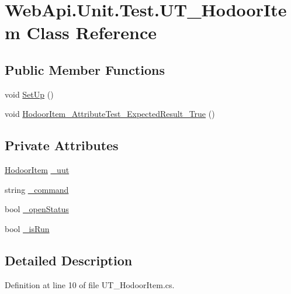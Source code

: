 \hypertarget{class_web_api_1_1_unit_1_1_test_1_1_u_t___hodoor_item}{}\section{Web\+Api.\+Unit.\+Test.\+U\+T\+\_\+\+Hodoor\+Item Class Reference}
\label{class_web_api_1_1_unit_1_1_test_1_1_u_t___hodoor_item}
\subsection*{Public Member Functions}
\begin{DoxyCompactItemize}
\item 
void \mbox{\hyperlink{class_web_api_1_1_unit_1_1_test_1_1_u_t___hodoor_item_aba98a328527156d517f0f4aa1f44caaf}{Set\+Up}} ()
\item 
void \mbox{\hyperlink{class_web_api_1_1_unit_1_1_test_1_1_u_t___hodoor_item_a4b4725c595adc69bbe38057ae596c7f8}{Hodoor\+Item\+\_\+\+Attribute\+Test\+\_\+\+Expected\+Result\+\_\+\+True}} ()
\end{DoxyCompactItemize}
\subsection*{Private Attributes}
\begin{DoxyCompactItemize}
\item 
\mbox{\hyperlink{class_f_w_p_s_1_1_models_1_1_hodoor_item}{Hodoor\+Item}} \mbox{\hyperlink{class_web_api_1_1_unit_1_1_test_1_1_u_t___hodoor_item_a539119e2000d67342a2dda9e0be5e146}{\+\_\+uut}}
\item 
string \mbox{\hyperlink{class_web_api_1_1_unit_1_1_test_1_1_u_t___hodoor_item_a453d5cefe01f568532768a7410489ac0}{\+\_\+command}}
\item 
bool \mbox{\hyperlink{class_web_api_1_1_unit_1_1_test_1_1_u_t___hodoor_item_a9883dcd188009e18edee553292c53d10}{\+\_\+open\+Status}}
\item 
bool \mbox{\hyperlink{class_web_api_1_1_unit_1_1_test_1_1_u_t___hodoor_item_ac362be80f181d73bc35b4a4cabdd08df}{\+\_\+is\+Run}}
\end{DoxyCompactItemize}


\subsection{Detailed Description}


Definition at line 10 of file U\+T\+\_\+\+Hodoor\+Item.\+cs.



